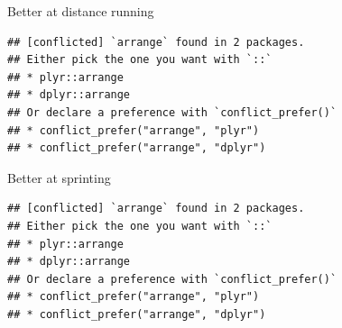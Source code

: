 \documentclass[ignorenonframetext,]{beamer}
\newenvironment{Shaded}{\begin{snugshade}}{\end{snugshade}}
\newcommand{\DataTypeTok}[1]{\textcolor[rgb]{0.13,0.29,0.53}{#1}}
\newcommand{\DecValTok}[1]{\textcolor[rgb]{0.00,0.00,0.81}{#1}}
\newcommand{\FloatTok}[1]{\textcolor[rgb]{0.00,0.00,0.81}{#1}}
\newcommand{\KeywordTok}[1]{\textcolor[rgb]{0.13,0.29,0.53}{\textbf{#1}}}
\newcommand{\NormalTok}[1]{#1}
\newcommand{\OperatorTok}[1]{\textcolor[rgb]{0.81,0.36,0.00}{\textbf{#1}}}
\newcommand{\StringTok}[1]{\textcolor[rgb]{0.31,0.60,0.02}{#1}}
\begin{document}
\begin{frame}[fragile]{Better at distance running}
\protect\hypertarget{better-at-distance-running}{}

\begin{Shaded}
\end{Shaded}

\begin{verbatim}
## [conflicted] `arrange` found in 2 packages.
## Either pick the one you want with `::` 
## * plyr::arrange
## * dplyr::arrange
## Or declare a preference with `conflict_prefer()`
## * conflict_prefer("arrange", "plyr")
## * conflict_prefer("arrange", "dplyr")
\end{verbatim}

\end{frame}

\begin{frame}[fragile]{Better at sprinting}
\protect\hypertarget{better-at-sprinting}{}

\begin{Shaded}
\end{Shaded}

\begin{verbatim}
## [conflicted] `arrange` found in 2 packages.
## Either pick the one you want with `::` 
## * plyr::arrange
## * dplyr::arrange
## Or declare a preference with `conflict_prefer()`
## * conflict_prefer("arrange", "plyr")
## * conflict_prefer("arrange", "dplyr")
\end{verbatim}

\end{frame}
\end{document}

